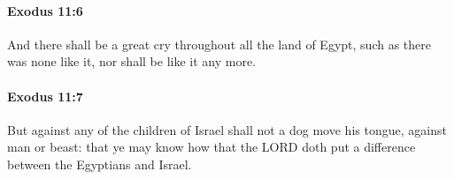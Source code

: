 		\paragraph{Exodus 11:6} %
			\label{EXODUS-11-6}

			And there shall be a great cry throughout all the land of Egypt, such as there was none like it, nor shall be like it any more.


		\paragraph{Exodus 11:7} %
			\label{EXODUS-11-7}

			But against any of the children of Israel shall not a dog move his tongue, against man or beast: that ye may know how that the LORD doth put a difference between the Egyptians and Israel.


